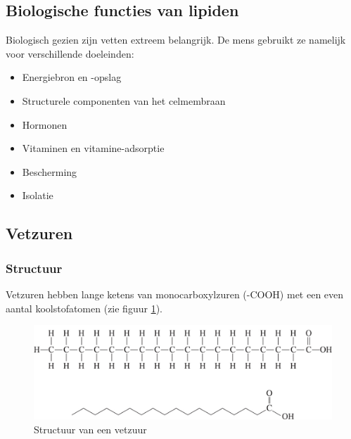 \documentclass[a4paper,kul]{kulakarticle} %
\begin{document}
\subsection{Biologische functies van lipiden}
Biologisch gezien zijn vetten extreem belangrijk. De mens gebruikt ze namelijk voor verschillende doeleinden:
\begin{itemize}
	\item Energiebron en -opslag
	\item Structurele componenten van het celmembraan
	\item Hormonen
	\item Vitaminen en vitamine-adsorptie
	\item Bescherming
	\item Isolatie
\end{itemize}
\subsection{Vetzuren}
\subsubsection{Structuur}
Vetzuren hebben lange ketens van monocarboxylzuren (-COOH) met een even aantal koolstofatomen (zie figuur \ref{fig:structuurvetzuur}).
\begin{figure}[h]
	\centering
	\includegraphics[width=0.7\linewidth]{StructuurVetZuur}
	\caption[Vetzuur]{Structuur van een vetzuur}
	\label{fig:structuurvetzuur}
\end{figure}
\end{document}
